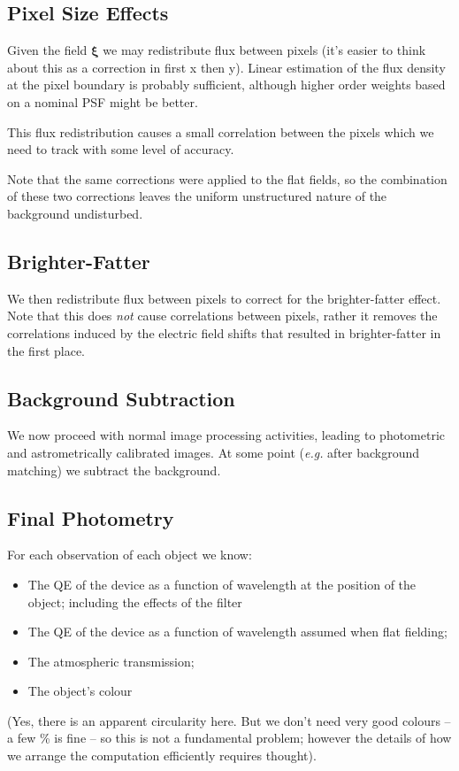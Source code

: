 \documentclass[12pt]{article}
\newcommand{\eg}{\textit{e.g.}\xspace}
\newcommand{\xib}{{\boldsymbol \xi}}
\begin{document}
\subsection{Pixel Size Effects}
\label{sec:correctingPixelSizes}

Given the field $\xib$ we may redistribute flux between pixels (it's easier to think about this
as a correction in first x then y).  Linear estimation of the flux density at the pixel boundary
is probably sufficient, although higher order weights based on a nominal PSF might be better.

This flux redistribution causes a small correlation between the pixels which we need to track
with some level of accuracy.

Note that the same corrections were applied to the flat fields, so the combination of these
two corrections leaves the uniform unstructured nature of the background undisturbed.

\subsection{Brighter-Fatter}

We then redistribute flux between pixels to correct for the brighter-fatter effect.  Note that
this does \textit{not} cause correlations between pixels, rather it removes the correlations
induced by the electric field shifts that resulted in brighter-fatter in the first place.

\subsection{Background Subtraction}

We now proceed with normal image processing activities, leading to photometric and astrometrically
calibrated images.  At some point (\eg after background matching) we subtract the background.

\subsection{Final Photometry}

For each observation of each object we know:
\begin{itemize}
\item The QE of the device as a function of wavelength at the position of the object;
  including the effects of the filter
\item The QE of the device as a function of wavelength assumed when flat fielding;
\item The atmospheric transmission;
\item The object's colour
\end{itemize}
(Yes, there is an apparent circularity here.  But we don't need very good colours -- a few \% is fine -- so
this is not a fundamental problem;  however the details of how we arrange the computation efficiently
requires thought).
\end{document}
